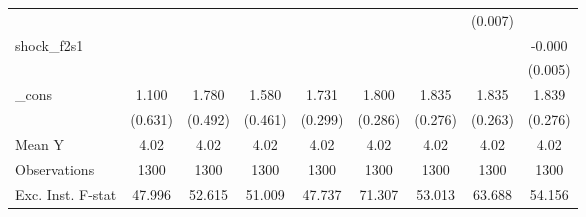 {\begin{tabular}{l*{8}{c}}
            &                     &                     &                     &                     &                     &                     &     (0.007)         &                     \\
\addlinespace
shock\_f2s1  &                     &                     &                     &                     &                     &                     &                     &      -0.000         \\
            &                     &                     &                     &                     &                     &                     &                     &     (0.005)         \\
\addlinespace
\_cons      &       1.100\sym{*}  &       1.780\sym{***}&       1.580\sym{***}&       1.731\sym{***}&       1.800\sym{***}&       1.835\sym{***}&       1.835\sym{***}&       1.839\sym{***}\\
            &     (0.631)         &     (0.492)         &     (0.461)         &     (0.299)         &     (0.286)         &     (0.276)         &     (0.263)         &     (0.276)         \\
\midrule
Mean Y      &        4.02         &        4.02         &        4.02         &        4.02         &        4.02         &        4.02         &        4.02         &        4.02         \\
Observations&        1300         &        1300         &        1300         &        1300         &        1300         &        1300         &        1300         &        1300         \\
Exc. Inst. F-stat&      47.996         &      52.615         &      51.009         &      47.737         &      71.307         &      53.013         &      63.688         &      54.156         \\
\bottomrule
\end{tabular}
}
